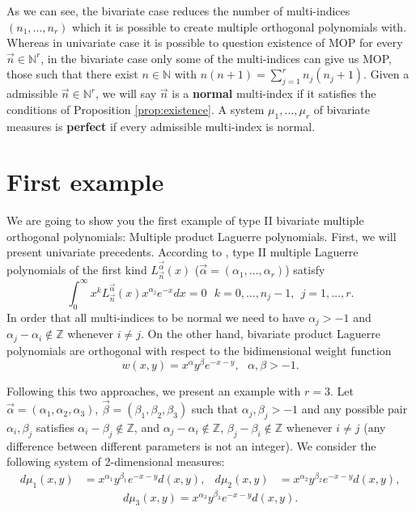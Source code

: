 \documentclass[12pt,a4]{article}
\theoremstyle{plain}
\newcommand{\N}[0]{\mathbb{N}}
\newcommand{\Z}[0]{\mathbb{Z}}
\begin{document}
As we can see, the bivariate case reduces the number of multi-indices $(n_1,\dots,n_r)$ which it is possible to create multiple orthogonal polynomials with. Whereas in univariate case it is possible to question existence of MOP for every $\vec n\in \N^r$, in the bivariate case only some of the multi-indices can give us MOP, those such that there exist $n\in\N$ with $n(n+1)=\displaystyle\sum_{j=1}^r n_j (n_j+1)$. Given a admissible $\vec n\in\N^r$, we will say $\vec n$ is a \textbf{normal} multi-index if it satisfies the conditions of Proposition \ref{prop:existence}. A system $\mu_1,\dots,\mu_r$ of bivariate measures is \textbf{perfect} if every admissible multi-index is normal.

\section{First example}

We are going to show you the first example of type II bivariate multiple orthogonal polynomials: Multiple product Laguerre polynomials. First, we will present univariate precedents. According to \cite[Page 658, Section 3.6.1]{foupouagnigni-2020}, type II multiple Laguerre polynomials of the first kind $L_{\vec n}^{\vec\alpha}(x)$ ($\vec\alpha=(\alpha_1,\dots,\alpha_r)$) satisfy
\begin{equation}
    \int_0^\infty x^k L_{\vec n}^{\vec\alpha}(x) x^{\alpha_j} e^{-x} dx =0 \ \ \ k=0,\dots, n_j-1, \ \ j=1,\dots,r. 
\end{equation}
In order that all multi-indices to be normal we need to have $\alpha_j>-1$ and $\alpha_j- \alpha_i\not\in\Z$ whenever $i\neq j$. On the other hand, bivariate product Laguerre polynomials \cite[Ch. II, Section 2.2]{dunkl_xu_2014} are orthogonal with respect to the bidimensional weight function
$$w(x,y)=x^\alpha y^\beta e^{-x-y}, \ \ \ \alpha,\beta>-1.$$ 

Following this two approaches, we present an example with $r=3$. Let $\vec\alpha=(\alpha_1,\alpha_2,\alpha_3)$, $\vec\beta=(\beta_1,\beta_2,\beta_3)$ such that $\alpha_j,\beta_j > -1$ and any possible pair $\alpha_i,\beta_j$ satisfies $\alpha_i-\beta_j\not\in\Z$, and  $\alpha_j- \alpha_i\not\in\Z$, $\beta_j- \beta_i\not\in\Z$ whenever $i\neq j$ (any difference between different parameters is not an integer). We consider the following system of 2-dimensional measures:
\begin{align}
    d\mu_1(x,y) &= x^{\alpha_1} y^{\beta_1} e^{-x-y} d(x,y), & d\mu_2(x,y) &= x^{\alpha_2} y^{\beta_2} e^{-x-y} d(x,y),
\end{align}
$$d\mu_3(x,y) = x^{\alpha_3} y^{\beta_3} e^{-x-y} d(x,y).$$
\end{document}
